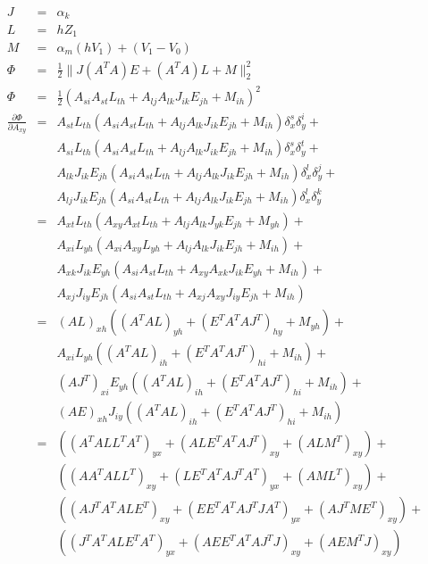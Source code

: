 \documentclass[9pt,twocolumn]{extarticle}
\begin{document}
\begin{eqnarray*}
  J &=& \alpha_k\\
  L &=& hZ_1\\
  M &=& \alpha_m(hV_1)+(V_1-V_0)\\
  \Phi &=& \frac{1}{2}\| J(A^TA)E + (A^TA)L + M \|_2^2\\
  \Phi &=& \frac{1}{2}(A_{si}A_{st}L_{th}+A_{lj}A_{lk}J_{ik}E_{jh}+M_{ih})^2\\
  \frac{\partial{\Phi}}{\partial{A_{xy}}}
  &=&A_{st}L_{th}(A_{si}A_{st}L_{th}+A_{lj}A_{lk}J_{ik}E_{jh}+M_{ih})\delta_x^s\delta_y^i+\\
  &&A_{si}L_{th}(A_{si}A_{st}L_{th}+A_{lj}A_{lk}J_{ik}E_{jh}+M_{ih})\delta_x^s\delta_y^t+\\
  &&A_{lk}J_{ik}E_{jh}(A_{si}A_{st}L_{th}+A_{lj}A_{lk}J_{ik}E_{jh}+M_{ih})\delta_x^l\delta_y^j+\\
  &&A_{lj}J_{ik}E_{jh}(A_{si}A_{st}L_{th}+A_{lj}A_{lk}J_{ik}E_{jh}+M_{ih})\delta_x^l\delta_y^k\\
  &=&A_{xt}L_{th}(A_{xy}A_{xt}L_{th}+A_{lj}A_{lk}J_{yk}E_{jh}+M_{yh})+\\
  &&A_{xi}L_{yh}(A_{xi}A_{xy}L_{yh}+A_{lj}A_{lk}J_{ik}E_{jh}+M_{ih})+\\
  &&A_{xk}J_{ik}E_{yh}(A_{si}A_{st}L_{th}+A_{xy}A_{xk}J_{ik}E_{yh}+M_{ih})+\\
  &&A_{xj}J_{iy}E_{jh}(A_{si}A_{st}L_{th}+A_{xj}A_{xy}J_{iy}E_{jh}+M_{ih})\\
  &=&  (AL)_{xh}((A^TAL)_{yh}+(E^TA^TAJ^T)_{hy}+M_{yh})+\\
  &&A_{xi}L_{yh}((A^TAL)_{ih}+(E^TA^TAJ^T)_{hi}+M_{ih})+\\
  &&(AJ^T)_{xi}E_{yh}((A^TAL)_{ih}+(E^TA^TAJ^T)_{hi}+M_{ih})+\\
  &&(AE)_{xh}J_{iy}((A^TAL)_{ih}+(E^TA^TAJ^T)_{hi}+M_{ih})\\
  &=& ((A^TALL^TA^T)_{yx}+(ALE^TA^TAJ^T)_{xy}+(ALM^T)_{xy})+\\
  &&((AA^TALL^T)_{xy}+(LE^TA^TAJ^TA^T)_{yx}+(AML^T)_{xy})+\\
  &&((AJ^TA^TALE^T)_{xy}+(EE^TA^TAJ^TJA^T)_{yx}+(AJ^TME^T)_{xy})+\\
  &&((J^TA^TALE^TA^T)_{yx}+(AEE^TA^TAJ^TJ)_{xy}+(AEM^TJ)_{xy})
\end{eqnarray*}
\end{document}
